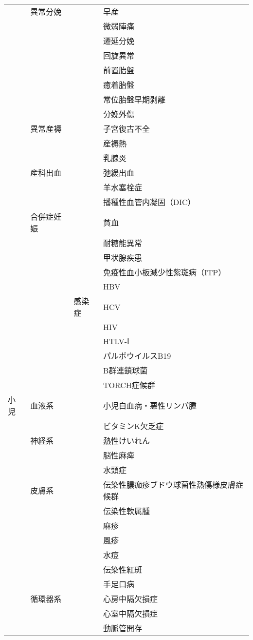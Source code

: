 \begin{xltabular}{\linewidth}{XXXX}
 & 異常分娩 &  & 早産 \\
 &  &  & 微弱陣痛 \\
 &  &  & 遷延分娩 \\
 &  &  & 回旋異常 \\
 &  &  & 前置胎盤 \\
 &  &  & 癒着胎盤 \\
 &  &  & 常位胎盤早期剥離 \\
 &  &  & 分娩外傷 \\
 & 異常産褥 &  & 子宮復古不全 \\
 &  &  & 産褥熱 \\
 &  &  & 乳腺炎 \\
 & 産科出血 &  & 弛緩出血 \\
 &  &  & 羊水塞栓症 \\
 &  &  & 播種性血管内凝固（DIC） \\
 & 合併症妊娠 &  & 貧血 \\
 &  &  & 耐糖能異常 \\
 &  &  & 甲状腺疾患 \\
 &  &  & 免疫性血小板減少性紫斑病（ITP） \\
 &  &  & HBV \\
 &  & 感染症 & HCV \\
 &  &  & HIV \\
 &  &  & HTLV-Ⅰ \\
 &  &  & パルボウイルスB19 \\
 &  &  & B群連鎖球菌 \\
 &  &  & TORCH症候群 \\
小児 & 血液系 &  & 小児白血病・悪性リンパ腫 \\
 &  &  & ビタミンK欠乏症 \\
 & 神経系 &  & 熱性けいれん \\
 &  &  & 脳性麻痺 \\
 &  &  & 水頭症 \\
 & 皮膚系 &  & 伝染性膿痂疹ブドウ球菌性熱傷様皮膚症候群 \\
 &  &  & 伝染性軟属腫 \\
 &  &  & 麻疹 \\
 &  &  & 風疹 \\
 &  &  & 水痘 \\
 &  &  & 伝染性紅斑 \\
 &  &  & 手足口病 \\
 & 循環器系 &  & 心房中隔欠損症 \\
 &  &  & 心室中隔欠損症 \\
 &  &  & 動脈管開存 \\

\end{xltabular}
